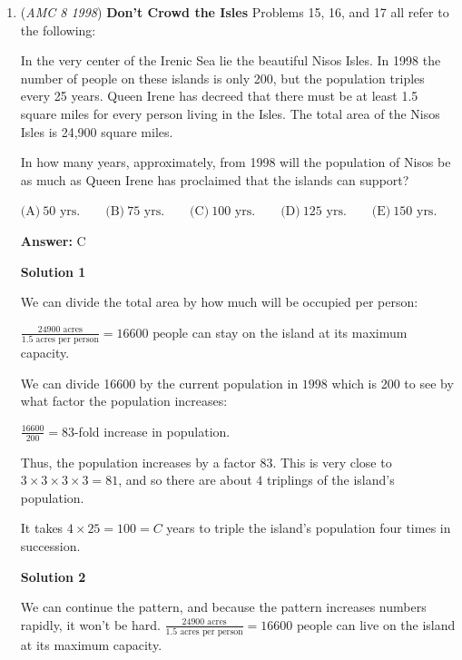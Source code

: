 \begin{enumerate}
 $\boxed{B}$



	\item (\textit{AMC 8 1998}) \textbf{Don't Crowd the Isles} Problems 15, 16, and 17 all refer to the following:


 
In the very center of the Irenic Sea lie the beautiful Nisos Isles.  In 1998 the number of people on these islands is only 200, but the population triples every 25 years.  Queen Irene has decreed that there must be at least 1.5 square miles for every person living in the Isles.  The total area of the Nisos Isles is 24,900 square miles.


 


 In how many years, approximately, from 1998 will the population of Nisos be as much as Queen Irene has proclaimed that the islands can support?


 $\text{(A)}\ 50\text{ yrs.} \qquad \text{(B)}\ 75\text{ yrs.} \qquad \text{(C)}\ 100\text{ yrs.} \qquad \text{(D)}\ 125\text{ yrs.} \qquad \text{(E)}\ 150\text{ yrs.}$

 \textbf{Answer: }C



\textbf{Solution 1}

We can divide the total area by how much will be occupied per person:

 $\frac{24900 \text{ acres}}{1.5 \text{ acres per person}}=16600 \text{ people}$ can stay on the island at its maximum capacity.

 We can divide 16600 by the current population in $1998$ which is 200 to see by what factor the population increases:

 $\frac{16600}{200}=83$-fold increase in population.

 Thus, the population increases by a factor $83$.  This is very close to $3 \times 3 \times 3 \times 3 = 81$, and so there are about $4$ triplings of the island's population.

 It takes $4\times25=100=\boxed{C}$ years to triple the island's population four times in succession.

 



\textbf{Solution 2}

We can continue the pattern, and because the pattern increases numbers rapidly, it won't be hard. $\frac{24900 \text{ acres}}{1.5 \text{ acres per person}}=16600 \text{ people}$ can live on the island at its maximum capacity. 


\end{enumerate}

